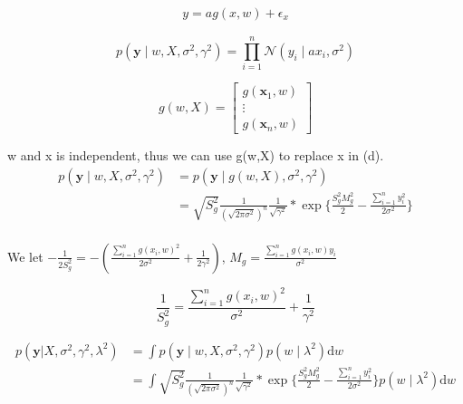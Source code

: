 \documentclass[11pt]{article}
\newcommand{\mbf}[1]{{\boldsymbol{\mathbf{#1}}}}
\renewcommand{\bm}{\mbf}
\begin{document}
\begin{enumerate}
\begin{enumerate}[label=(\alph*)]
\begin{align}
    y = a g(x,w) + \epsilon_x 
\end{align}

$$
p(\mathbf{y} \mid w,{X}, \sigma^2, \gamma^2)=\prod_{i=1}^{n} \mathcal{N}\left(y_{i} \mid {a} {x}_{i}, \sigma^2 \right)
$$

$$
g(w,X)=\left[\begin{array}{c}
g(\mathbf{x}_{1}, w) \\
\vdots \\
g(\mathbf{x}_{n}, w) 
\end{array}\right] 
$$

w and x is independent, thus we can use g(w,X) to replace x in (d).
$$
\begin{aligned}
p(\mathbf{y} \mid w, X, \sigma^2, \gamma^2) 
&=p(\mathbf{y} \mid g(w,X), \sigma^2, \gamma^2) \\
&= \sqrt{ S_g^2} \frac{1}{(\sqrt{2\pi \sigma^2})^n} \frac{1}{\sqrt{\gamma^2}} * \exp \{\frac{S_g^2M_g^2}{2} - \frac{\sum_{i=1}^{n}{y_i^2}}{2\sigma^2}\} \\
\end{aligned}
$$

We let $ -\frac{1}{2S_g^2}  =  -( \frac{\sum_{i=1}^{n}{g(x_i,w)^2}}{2\sigma^2} + \frac{1}{2\gamma^2}) $, $M_g = \frac{\sum_{i=1}^{n} g(x_i,w) y_i}{\sigma^2}$


$$
\frac{1}{S_g^2} =  \frac{\sum_{i=1}^{n}{g(x_i,w)^2}}{\sigma^2} + \frac{1}{\gamma^2}
$$


$$
\begin{aligned}
p(\bm{y} | X, \sigma^2, \gamma^2, \lambda^2) 
&=\int p(\mathbf{y} \mid w, X, \sigma^2, \gamma^2)  p({w} \mid \lambda^2) \mathrm{d} w \\
&=\int \sqrt{ S_g^2} \frac{1}{(\sqrt{2\pi \sigma^2})^n} \frac{1}{\sqrt{\gamma^2}} * \exp \{\frac{S_g^2M_g^2}{2} - \frac{\sum_{i=1}^{n}{y_i^2}}{2\sigma^2}\}  p({w} \mid \lambda^2) \mathrm{d} w
\end{aligned}
$$


\end{enumerate}
\end{enumerate}
\end{document}
